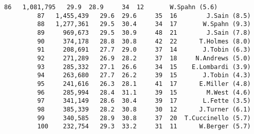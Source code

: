 \documentclass[11pt]{article}
\begin{document}
\begin{Verbatim}[commandchars=\\\{\}]
         86   1,081,795   29.9  28.9     34  12       W.Spahn (5.6)   
         87   1,455,439   29.6  29.6     35  16        J.Sain (8.5)   
         88   1,277,361   29.5  30.4     34  17       W.Spahn (9.3)   
         89     969,673   29.5  30.9     48  21        J.Sain (7.8)   
         90     374,178   28.8  30.8     42  22      T.Holmes (8.0)   
         91     208,691   27.7  29.0     37  14       J.Tobin (6.3)   
         92     271,289   26.9  28.2     37  18     N.Andrews (5.0)   
         93     285,332   27.1  26.6     34  15    E.Lombardi (3.9)   
         94     263,680   27.7  26.2     39  15       J.Tobin (4.3)   
         95     241,616   26.3  28.1     41  17      E.Miller (4.8)   
         96     285,994   28.4  31.1     39  15        M.West (4.6)   
         97     341,149   28.6  30.4     39  17       L.Fette (3.5)   
         98     385,339   28.2  30.8     30  12      J.Turner (6.1)   
         99     340,585   28.9  30.8     37  20  T.Cuccinello (5.7)   
         100    232,754   29.3  33.2     31  11      W.Berger (5.7)   
         

\end{Verbatim}
\end{document}
